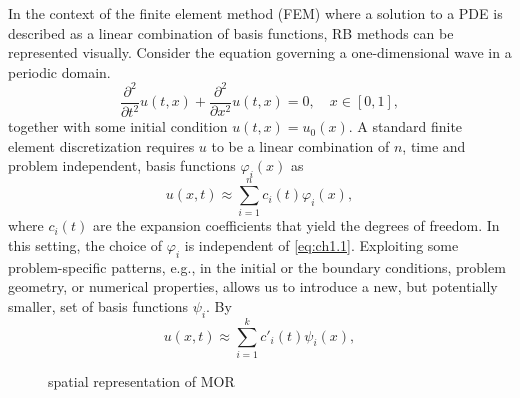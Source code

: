 In the context of the finite element method (FEM) where a solution to a PDE is described as a linear combination of basis functions, RB methods can be represented visually. Consider the equation governing a one-dimensional wave in a periodic domain.
\begin{equation} \label{eq:ch1.1}
	\frac{\partial^2 }{\partial t^2} u(t,x) + \frac{\partial^2 }{\partial x^2} u(t,x) = 0, \quad x\in[0,1],
\end{equation}
together with some initial condition $u(t,x) = u_0(x)$. A standard finite element discretization requires $u$ to be a linear combination of $n$, time and problem independent, basis functions $\varphi_i(x)$ as
\begin{equation} \label{eq:ch1.2}
	u(x,t) \approx \sum_{i=1}^n c_i(t) \varphi_i(x),
\end{equation}
where $c_i(t)$ are the expansion coefficients that yield the degrees of freedom. In this setting, the choice of $\varphi_i$ is independent of \eqref{eq:ch1.1}. Exploiting some problem-specific patterns, e.g., in the initial or the boundary conditions, problem geometry, or numerical properties, allows us to introduce a new, but potentially smaller, set of basis functions $\psi_i$. By
\begin{equation} \label{eq:ch1.3}
	u(x,t) \approx \sum_{i=1}^k c'_i(t) \psi_i(x),
\end{equation}
\begin{figure} [t]
	\caption{spatial representation of MOR}
	\label{fig:ch1.1}
\end{figure}
